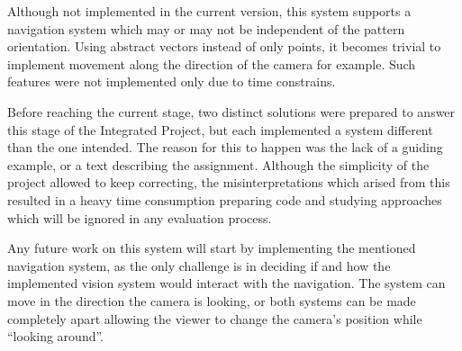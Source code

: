 \documentclass{acmtog}
\begin{document}
Although not implemented in the current version, this system supports a navigation system which may or may not be independent of the pattern orientation. Using abstract vectors instead of only points, it becomes trivial to implement movement along the direction of the camera for example. Such features were not implemented only due to time constrains.

Before reaching the current stage, two distinct solutions were prepared to answer this stage of the Integrated Project, but each implemented a system different than the one intended. The reason for this to happen was the lack of a guiding example, or a text describing the assignment. Although the simplicity of the project allowed to keep correcting, the misinterpretations which arised from this resulted in a heavy time consumption preparing code and studying approaches which will be ignored in any evaluation process.

Any future work on this system will start by implementing the mentioned navigation system, as the only challenge is in deciding if and how the implemented vision system would interact with the navigation. The system can move in the direction the camera is looking, or both systems can be made completely apart allowing the viewer to change the camera's position while ``looking around''.
\end{document}
